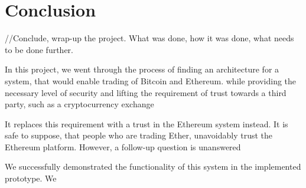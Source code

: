 \section{Conclusion}\label{sec:conclusion}

//Conclude, wrap-up the project. What was done, how it was done, what needs to be done further.

In this project, we went through the process of finding an architecture for a system, that would enable trading of Bitcoin and Ethereum.  while providing the necessary level of security and lifting the requirement of trust towards a third party, such as a cryptocurrency exchange

It replaces this requirement with a trust in the Ethereum system instead. It is safe to suppose, that people who are trading Ether, unavoidably trust the Ethereum platform. However, a follow-up question is unanswered

We successfully demonstrated the functionality of this system in the implemented prototype. We 